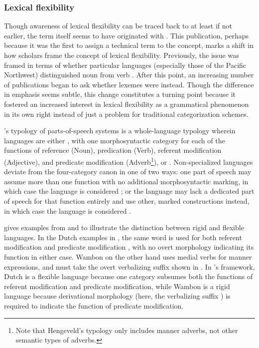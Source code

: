 \subsubsection{Lexical flexibility}
\label{sec:2.3.1.1}

Though awareness of lexical flexibility can be traced back to at least \textcite[174--177]{Gallatin1836} if not earlier, the term  itself seems to have originated with \textcite[Ch.~4]{Hengeveld1992}. This publication, perhaps because it was the first to assign a technical term to the concept, marks a shift in how scholars frame the concept of lexical flexibility. Previously, the issue was framed in terms of whether particular languages (especially those of the Pacific Northwest) distinguished noun from verb \parencites{Kuipers1968}{Jacobsen1979}{Hebert1983}{Kinkade1983}{EijkHess1986}{JelinekDemers1994}. After this point, an increasing number of publications began to ask whether lexemes were  instead. Though the difference in emphasis seems subtle, this change constitutes a turning point because it fostered an increased interest in lexical flexibility as a grammatical phenomenon in its own right instead of just a problem for traditional categorization schemes.

\citeauthor{Hengeveld1992}'s \citeyear[Ch.~4]{Hengeveld1992} typology of parts-of-speech systems is a whole-language typology wherein languages are either , with one morphosyntactic category for each of the functions of reference (Noun), predication (Verb), referent modification (Adjective), and predicate modification (Adverb\footnote{Note that Hengeveld's typology only includes manner adverbs, not other semantic types of adverbs.}), or . Non-specialized languages deviate from the four-category canon in one of two ways: one part of speech may assume more than one function with no additional morphosyntactic marking, in which case the language is considered ; or the language may lack a dedicated part of speech for that function entirely and use other, marked constructions instead, in which case the language is considered .

\citeauthor{Hengeveld1992} gives examples from  and  to illustrate the distinction between rigid and flexible languages. In the Dutch examples in , the same word  is used for both referent modification  and predicate modification , with no overt morphology indicating its function in either case. Wambon on the other hand uses medial verbs for manner expressions, and must take the overt verbalizing suffix  shown in . In \citeauthor{Hengeveld1992}'s framework, Dutch is a flexible language because one category subsumes both the functions of referent modification and predicate modification, while Wambon is a rigid language because derivational morphology (here, the verbalizing suffix ) is required to indicate the function of predicate modification.

